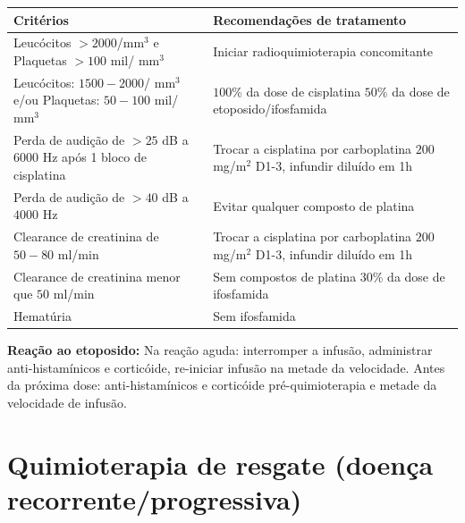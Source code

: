\documentclass[11pt,a4paper,oldfontcommands]{memoir}
\begin{document}
\begin{center}
\begin{table}[H]
\begin{tabular}{p{5cm}|p{6cm}}
\hline
{\textbf{Critérios}}&{\textbf{Recomendações de tratamento}}\\
\hline
{Leucócitos \(> 2000\)/mm\(^3\) e Plaquetas \(> 100\) mil/ mm\(^3\)}&{Iniciar radioquimioterapia concomitante}\\
\hline
{Leucócitos: \(1500-2000\)/ mm\(^3\) e/ou Plaquetas: \(50-100\) mil/ mm\(^3\)}&{\(100\)\% da dose de cisplatina \(50\)\% da dose de etoposido/ifosfamida}\\
\hline
{Perda de audição de \(>25\) dB a \(6000\) Hz após 1 bloco de cisplatina}&{Trocar a cisplatina por carboplatina \(200\) mg/m\(^2\) D1-3, infundir diluído em 1h}\\
\hline
{Perda de audição de \(>40\) dB a \(4000\) Hz}&{Evitar qualquer composto de platina}\\
\hline
{Clearance de creatinina de \(50-80\) ml/min}&{Trocar a cisplatina por carboplatina \(200\) mg/m\(^2\) D1-3, infundir diluído em 1h}\\
\hline
{Clearance de creatinina menor que \(50\) ml/min}&{Sem compostos de platina \(30\)\% da dose de ifosfamida}\\
\hline
{Hematúria}&{Sem ifosfamida}\\
\hline
\end{tabular}
\end{table}

\end{center}

\textbf{Reação ao etoposido:}
Na reação aguda: interromper a infusão, administrar anti-histamínicos e corticóide, re-iniciar infusão na metade da velocidade.
Antes da próxima dose: anti-histamínicos e corticóide pré-quimioterapia e metade da velocidade de infusão.

\cleardoublepage
\chapter{Quimioterapia de resgate (doença recorrente/progressiva)}

\cleardoublepage
\end{document}
